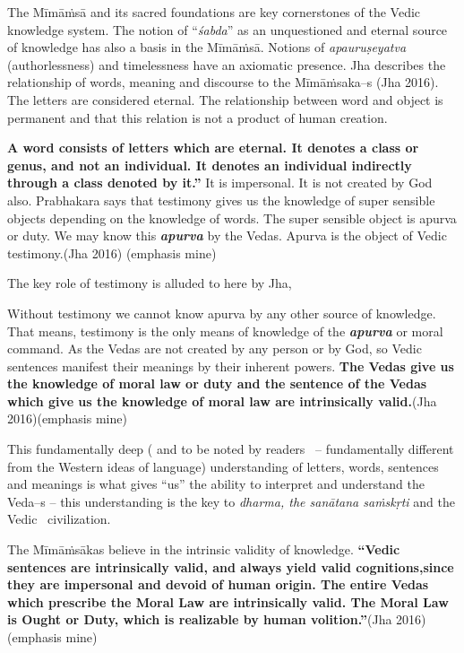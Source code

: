 The Mīmāṁsā and its sacred foundations are key cornerstones of the Vedic knowledge system. The notion of “\textit{śabda}” as an unquestioned and eternal source of knowledge has also a basis in the Mīmāṁsā. Notions of \textit{apauruṣeyatva} (authorlessness) and timelessness have an axiomatic presence. Jha describes the relationship of words, meaning and discourse to the Mīmāṁsaka–s (Jha 2016). The letters are considered eternal. The relationship between word and object is permanent and that this relation is not a product of human creation.

\newpage

\begin{myquote}
\textbf{A word consists of letters which are eternal. It denotes a class or genus, and not an individual. It denotes an individual indirectly through a class denoted by it.”} It is impersonal. It is not created by God also. Prabhakara says that testimony gives us the knowledge of super sensible objects depending on the knowledge of words. The super sensible object is apurva or duty. We may know this \textbf{\textit{apurva}} by the Vedas. Apurva is the object of Vedic testimony.\hfill (Jha 2016) (emphasis mine)
\end{myquote}

The key role of testimony is alluded to here by Jha,

\begin{myquote}
Without testimony we cannot know apurva by any other source of knowledge. That means, testimony is the only means of knowledge of the \textbf{\textit{apurva}} or moral command. As the Vedas are not created by any person or by God, so Vedic sentences manifest their meanings by their inherent powers. \textbf{The Vedas give us the knowledge of moral law or duty and the sentence of the Vedas which give us the knowledge of moral law are intrinsically valid.}\hfill (Jha 2016)(emphasis mine)
\end{myquote}

This fundamentally deep ( and to be noted by readers  – fundamentally different from the Western ideas of language) understanding of letters, words, sentences and meanings is what gives “us” the ability to interpret and understand the Veda–s – this understanding is the key to \textit{dharma, the sanātana saṁskṛti} and the Vedic  civilization.

\begin{myquote}
The Mīmāṁsākas believe in the intrinsic validity of knowledge. \textbf{“Vedic sentences are intrinsically valid, and always yield valid cognitions,since they are impersonal and devoid of human origin. The entire Vedas which prescribe the Moral Law are intrinsically valid. The Moral Law is Ought or Duty, which is realizable by human volition.”}\hfill (Jha 2016) (emphasis mine)
\end{myquote}


